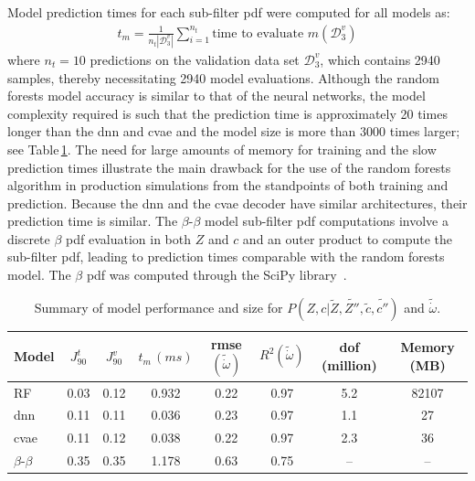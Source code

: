 \documentclass[review]{elsarticle}
\newcommand{\wt}[1]{\widetilde{#1}}
\begin{document}
Model prediction times for each sub-filter \gls{pdf} were computed for all
models as:
\begin{align}
  \label{eq:predict}
  t_m = \frac{1}{n_t |\mathcal{D}_3^v|} \sum_{i=1}^{n_t} \text{time to evaluate } m(\mathcal{D}_3^v)
\end{align}
where $n_t=10$ predictions on the validation data set
$\mathcal{D}_3^v$, which contains 2940 samples, thereby necessitating
2940 model evaluations. Although the random forests model accuracy is
similar to that of the neural networks, the model complexity required
is such that the prediction time is approximately 20 times longer than
the \gls{dnn} and \gls{cvae} and the model size is more than 3000 times
larger; see Table\,\ref{tab:summary}. The need for large amounts of memory
for training and the slow prediction times illustrate the main
drawback for the use of the random forests algorithm in production
simulations from the standpoints of both training and prediction. Because the
\gls{dnn} and the \gls{cvae} decoder have similar architectures, their
prediction time is similar. The $\beta$-$\beta$ model sub-filter
\gls{pdf} computations involve a discrete $\beta$ \gls{pdf} evaluation
in both $Z$ and $c$ and an outer product to compute the sub-filter
\gls{pdf}, leading to prediction times comparable with the random
forests model. The $\beta$ \gls{pdf} was computed through the SciPy
library~\cite{Jones2001}.

\begin{table}[!tbp]
  \centering
  \begin{tabular}{lccccccc}
    \toprule
    Model & $J^t_{90}$ & $J^v_{90}$ & $t_m\,(\unit{ms})$ & \gls{rmse}$(\wt{\dot{\omega}})$& $R^2(\wt{\dot{\omega}})$ & \gls{dof} (million)& Memory (MB)\\
    \midrule
    RF            & 0.03 & 0.12 & 0.932 & 0.22 & 0.97 & 5.2 & 82107 \\
    \gls{dnn}     & 0.11 & 0.11 & 0.036 & 0.23 & 0.97 & 1.1 & 27 \\
    \gls{cvae}    & 0.11 & 0.12 & 0.038 & 0.22 & 0.97 & 2.3 & 36 \\
    $\beta$-$\beta$ & 0.35 & 0.35 & 1.178 & 0.63 & 0.75 & {--} & {--} \\
    \bottomrule
  \end{tabular}
  \caption{Summary of model performance and size for $P(Z,c | \wt{Z}, \wt{Z''}, \wt{c}, \wt{c''})$ and $\wt{\dot{\omega}}$.}\label{tab:summary}
\end{table}
\end{document}

